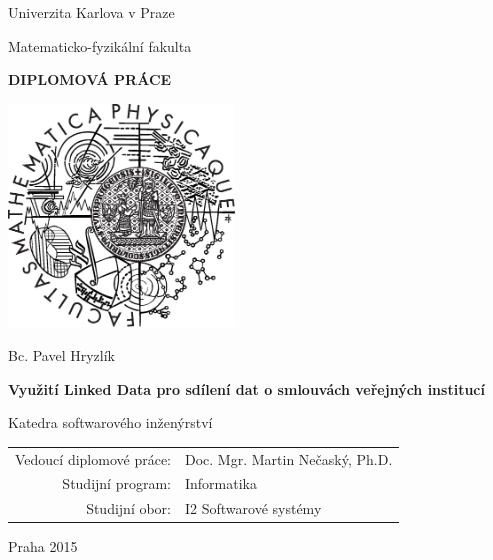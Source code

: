 \documentclass[12pt,a4paper]{report}
\begin{document}


\pagestyle{empty}
\begin{center}

\large

Univerzita Karlova v Praze

\medskip

Matematicko-fyzikální fakulta

\vfill

{\bf\Large DIPLOMOVÁ PRÁCE}

\vfill

\centerline{\mbox{\includegraphics[width=60mm]{img/logo.eps}}}

\vfill
\vspace{5mm}

{\LARGE Bc. Pavel Hryzlík}

\vspace{15mm}

{\LARGE\bfseries Využití Linked Data pro sdílení dat o smlouvách veřejných institucí}

\vfill

Katedra softwarového inženýrství

\vfill

\begin{tabular}{rl}

Vedoucí diplomové práce: & Doc. Mgr. Martin Nečaský, Ph.D. \\
\noalign{\vspace{2mm}}
Studijní program: & Informatika \\
\noalign{\vspace{2mm}}
Studijní obor: & I2 Softwarové systémy \\
\end{tabular}

\vfill

Praha 2015

\end{center}
\end{document}
